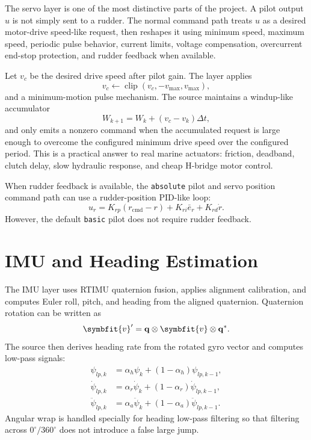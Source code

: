 \documentclass[10pt,twocolumn]{article}
\newcommand{\vct}[1]{\symbfit{#1}}   %
\newcommand{\quat}[1]{\mathbf{#1}}
\newcommand{\qconj}[1]{#1^{*}}
\newcommand{\qmul}{\otimes}
\newcommand{\clip}{\operatorname{clip}}
\newcommand{\heading}{\psi}
\newcommand{\cmd}{\mathrm{cmd}}
\begin{document}
The servo layer is one of the most distinctive parts of the project.  A pilot output
\(u\) is not simply sent to a rudder.  The normal command path treats \(u\) as a desired
motor-drive speed-like request, then reshapes it using minimum speed, maximum speed,
periodic pulse behavior, current limits, voltage compensation, overcurrent end-stop
protection, and rudder feedback when available.

Let \(v_c\) be the desired drive speed after pilot gain.  The layer applies
\begin{equation}
  v_c \leftarrow \clip(v_c, -v_{\max}, v_{\max}),
\end{equation}
and a minimum-motion pulse mechanism.  The source maintains a windup-like accumulator
\begin{equation}
  W_{k+1} = W_k + (v_c - v_k)\Delta t,
\end{equation}
and only emits a nonzero command when the accumulated request is large enough to overcome
the configured minimum drive speed over the configured period.  This is a practical answer
to real marine actuators: friction, deadband, clutch delay, slow hydraulic response, and
cheap H-bridge motor control.

When rudder feedback is available, the \texttt{absolute} pilot and servo position command
path can use a rudder-position PID-like loop:
\begin{equation}
  u_r = K_{rp}(r_{\cmd}-r) + K_{ri}\bar e_r + K_{rd}\dot r.
\end{equation}
However, the default \texttt{basic} pilot does not require rudder feedback.

\section{IMU and Heading Estimation}

The IMU layer uses RTIMU quaternion fusion, applies alignment calibration, and computes
Euler roll, pitch, and heading from the aligned quaternion.  Quaternion rotation can be
written as
\begin{equation}
  \vct{v}' = \quat{q}\qmul \vct{v}\qmul \qconj{\quat{q}}.
\end{equation}
The source then derives heading rate from the rotated gyro vector and computes low-pass
signals:
\begin{align}
  \heading_{lp,k} &= \alpha_h \heading_k + (1-\alpha_h)\heading_{lp,k-1}, \\
  \dot{\heading}_{lp,k} &= \alpha_r \dot{\heading}_k
     + (1-\alpha_r)\dot{\heading}_{lp,k-1}, \\
  \ddot{\heading}_{lp,k} &= \alpha_a \ddot{\heading}_k
     + (1-\alpha_a)\ddot{\heading}_{lp,k-1}.
\end{align}
Angular wrap is handled specially for heading low-pass filtering so that filtering across
\(0^{\circ}/360^{\circ}\) does not introduce a false large jump.
\end{document}
